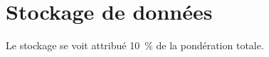 

\section{Stockage de données}
\label{s:cdc_stockage}

Le stockage se voit attribué 10~\% de la pondération totale.



